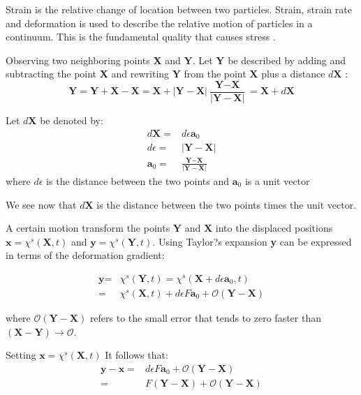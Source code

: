 Strain is the relative change of location between two particles. Strain, strain rate and deformation is used to describe the relative motion of particles in a continuum. This is the fundamental quality that causes stress \cite{Richter2010}.

Observing two neighboring points \textbf{X} and \textbf{Y}. Let \textbf{Y} be described by adding and subtracting the point \textbf{X} and rewriting \textbf{Y} from the point \textbf{X} plus a distance $d\textbf{X}$   :
\begin{equation}
\textbf{Y} = \textbf{Y} + \textbf{X} - \textbf{X} = \textbf{X} + |\textbf{Y} - \textbf{X}| \frac{\textbf{Y} - \textbf{X}}{|\textbf{Y} - \textbf{X}|} = \textbf{X} + d\textbf{X}
\end{equation}

Let $d\textbf{X}$ be denoted by:
\begin{align}
d\textbf{X} =& d\epsilon \textbf{a}_0\\
d\epsilon =& |\textbf{Y} - \textbf{X}| \\
\textbf{a}_0 =& \frac{\textbf{Y} - \textbf{X}}{|\textbf{Y} - \textbf{X}|}
\end{align}
where $d\epsilon$ is the distance between the two points and $\textbf{a}_0$ is a unit vector 

We see now that $d\textbf{X}$ is the distance between the two points times the unit vector. \newline

A certain motion transform the points $\textbf{Y}$ and $\textbf{X}$ into the displaced positions $\textbf{x} = \chi^s(\textbf{X},t)$ and $\textbf{y} = \chi^s(\textbf{Y},t)$. Using Taylor?s expansion \textbf{y} can be expressed in terms of the deformation gradient:

\begin{align}
\textbf{y} =& \chi^s(\textbf{Y},t) = \chi^s(\textbf{X} + d\epsilon \textbf{a}_0,t) \\
=& \chi^s(\textbf{X},t) + d\epsilon F \textbf{a}_0 + \mathcal{O}(\textbf{Y}-\textbf{X}) 
\end{align}

where $\mathcal{O} (\textbf{Y}-\textbf{X})$ refers to the small error that tends to zero faster than $(\textbf{X} - \textbf{Y}) \rightarrow \mathcal{O}$. \newline

Setting $\textbf{x} = \chi^s(\textbf{X},t)$  It follows that:
\begin{align}
\textbf{y} - \textbf{x} =&  d\epsilon F \textbf{a}_0 + \mathcal{O}(\textbf{Y}-\textbf{X}) \\
=& F(\textbf{Y} - \textbf{X}) + \mathcal{O}(\textbf{Y}-\textbf{X}) 
\end{align}

